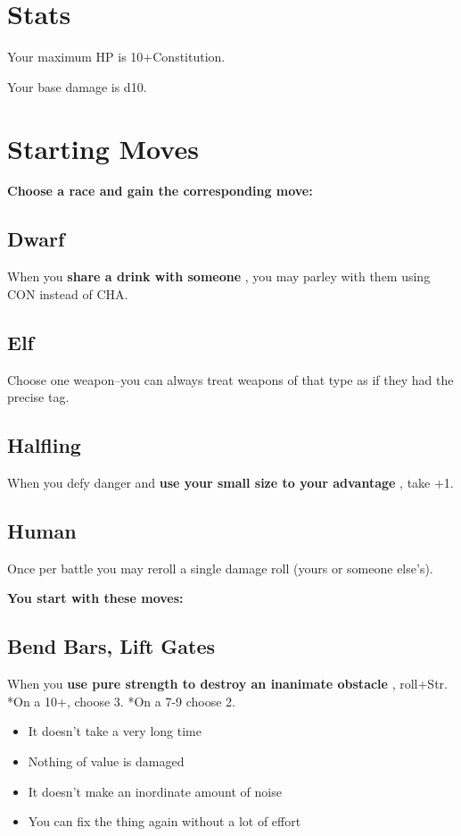\section*{Stats}


 Your maximum HP is 10+Constitution.


 Your base damage is d10.
\section*{Starting Moves}


{\bfseries Choose a race and gain the corresponding move:}
\subsection{Dwarf}


 When you \textbf{share a drink with someone}
, you may parley with them using CON instead of CHA.
\subsection{Elf}


 Choose one weapon--you can always treat weapons of that type as if they had the precise tag.
\subsection{Halfling}


 When you defy danger and \textbf{use your small size to your advantage}
, take +1.
\subsection{Human}


 Once per battle you may reroll a single damage roll (yours or someone else's).


\vspace{\baselineskip}
{\bfseries You start with these moves:}
\subsection{Bend Bars, Lift Gates}


 When you \textbf{use pure strength to destroy an inanimate obstacle}
, roll+Str. *On a 10+, choose 3. *On a 7-9 choose 2.
\begin{itemize}
\item It doesn't take a very long time
\item Nothing of value is damaged
\item It doesn't make an inordinate amount of noise
\item You can fix the thing again without a lot of effort

\end{itemize}
